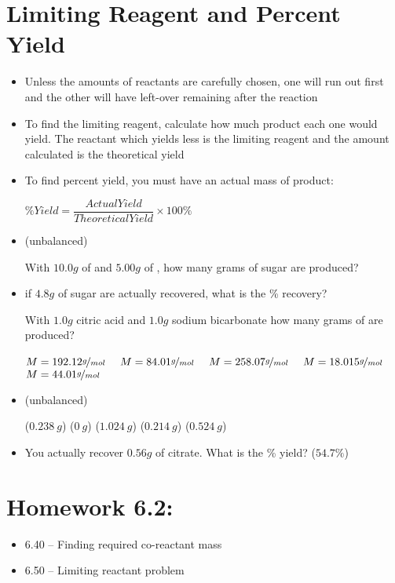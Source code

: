\documentclass[12pt, openany, letterpaper]{memoir}
\begin{document}
\section{Limiting Reagent and Percent Yield}
\begin{itemize}
	\item Unless the amounts of reactants are carefully chosen, one will run out first and the other will have left-over remaining after the reaction
	\item To find the limiting reagent, calculate how much product each one would yield. The reactant which yields less is the limiting reagent and the amount calculated is the theoretical yield
	\item To find percent yield, you must have an actual mass of product:

	      $\% Yield = \dfrac{Actual Yield}{Theoretical Yield}\times 100\%$
	\item {} (unbalanced)

	      With $10.0g$ of  and $5.00g$ of , how many grams of sugar are produced?
	\item if $4.8g$ of sugar are actually recovered, what is the \% recovery?


	      With $1.0g$ citric acid and $1.0g$ sodium bicarbonate how many grams of  are produced?

      $M=192.12\nicefrac{g}{mol}$ ~ $M=84.01\nicefrac{g}{mol}$ ~ $M=258.07\nicefrac{g}{mol}$ ~ $M=18.015\nicefrac{g}{mol}$ ~ $M=44.01\nicefrac{g}{mol}$





	\item {} (unbalanced)

      ($0.238~g$) \hspace{0.2em} ($0~g$) \hspace{3em} ($1.024~g$) \hspace{1.5em} ($0.214~g$) \hspace{1.5em} ($0.524~g$)

	\item You actually recover $0.56g$ of citrate. What is the \% yield? ($54.7\%$)
\end{itemize}

\section*{Homework 6.2:}
\begin{itemize}
  \item 6.40 -- Finding required co-reactant mass
  \item 6.50 -- Limiting reactant problem
\end{itemize}
\end{document}

